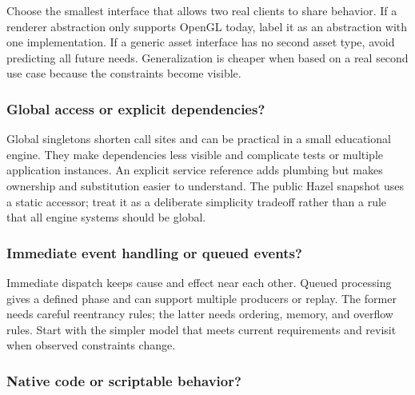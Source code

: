 \hypertarget{06-engine-ii-ch041-small-interface-now-or-generalized-framework-later}{}

Choose the smallest interface that allows two real clients to share behavior. If a renderer abstraction only supports OpenGL today, label it as an abstraction with one implementation. If a generic asset interface has no second asset type, avoid predicting all future needs. Generalization is cheaper when based on a real second use case because the constraints become visible.

\subsubsection{Global access or explicit dependencies?}\label{06-engine-ii-ch041-global-access-or-explicit-dependencies}

\hypertarget{06-engine-ii-ch041-global-access-or-explicit-dependencies}{}

Global singletons shorten call sites and can be practical in a small educational engine. They make dependencies less visible and complicate tests or multiple application instances. An explicit service reference adds plumbing but makes ownership and substitution easier to understand. The public Hazel snapshot uses a static  accessor; treat it as a deliberate simplicity tradeoff rather than a rule that all engine systems should be global.

\subsubsection{Immediate event handling or queued events?}\label{06-engine-ii-ch041-immediate-event-handling-or-queued-events}

\hypertarget{06-engine-ii-ch041-immediate-event-handling-or-queued-events}{}

Immediate dispatch keeps cause and effect near each other. Queued processing gives a defined phase and can support multiple producers or replay. The former needs careful reentrancy rules; the latter needs ordering, memory, and overflow rules. Start with the simpler model that meets current requirements and revisit when observed constraints change.

\subsubsection{Native code or scriptable behavior?}\label{06-engine-ii-ch041-native-code-or-scriptable-behavior}

